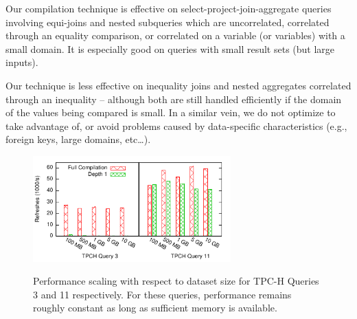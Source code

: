 Our compilation technique is effective on select-project-join-aggregate queries involving equi-joins and nested subqueries which are uncorrelated, correlated through an equality comparison, or correlated on a variable (or variables) with a small domain.  It is especially good on queries with small result sets (but large inputs).

Our technique is less effective on inequality joins and nested aggregates correlated through an inequality -- although both are still handled efficiently if the domain of the values being compared is small.  In a similar vein, we do not optimize to take advantage of, or avoid problems caused by data-specific characteristics (e.g., foreign keys, large domains, etc\ldots). 


\begin{figure}
\begin{center}
\includegraphics[width=3in]{../graphs/graphs/scaling.pdf} \\
\caption{Performance scaling with respect to dataset size for TPC-H Queries 3 and 11 respectively.  For these queries, performance remains roughly constant as long as sufficient memory is available.}
\label{fig:experiments:big}

\end{center}\vspace*{-0.2in}
\end{figure}



